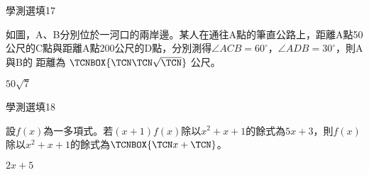 \begin{QUESTIONS}
\begin{QUESTION}
\begin{ExamInfo}{87}{學測}{選填}{17}
        \end{ExamInfo}
        \begin{ExamAnsRateInfo}{}{}{}{}
        \end{ExamAnsRateInfo}
        \begin{QBODY}
            如圖，A、B分別位於一河口的兩岸邊。某人在通往A點的筆直公路上，距離A點50公尺的C點與距離A點200公尺的D點，分別測得$\angle ACB=60^\circ$，$\angle ADB=30^\circ$，則A與B的
            距離為 $\TCNBOX{\TCN\TCN\sqrt{\TCN}}$ 公尺。
        \end{QBODY}
        \begin{QFROMS}
        \end{QFROMS}
        \begin{QTAGS}\end{QTAGS}
        \begin{QANS}
            $50\sqrt{7}$
        \end{QANS}
        \begin{QSOLLIST}
        \end{QSOLLIST}
        \begin{QEMPTYSPACE}
        \end{QEMPTYSPACE}
    \end{QUESTION}
    \begin{QUESTION}
        \begin{ExamInfo}{87}{學測}{選填}{18}
        \end{ExamInfo}
        \begin{ExamAnsRateInfo}{}{}{}{}
        \end{ExamAnsRateInfo}
        \begin{QBODY}
            設$f\left( x \right)$為一多項式。若$\left( x+1 \right)f\left( x \right)$除以${{x}^{2}}+x+1$的餘式為$5x+3$，則$f\left( x \right)$除以${{x}^{2}}+x+1$的餘式為$\TCNBOX{\TCN x + \TCN}$。
        \end{QBODY}
        \begin{QFROMS}
        \end{QFROMS}
        \begin{QTAGS}\end{QTAGS}
        \begin{QANS}
            $2x+5$
        \end{QANS}
        \begin{QSOLLIST}
        \end{QSOLLIST}
        \begin{QEMPTYSPACE}
        \end{QEMPTYSPACE}

\end{QUESTION}
\end{QUESTIONS}
